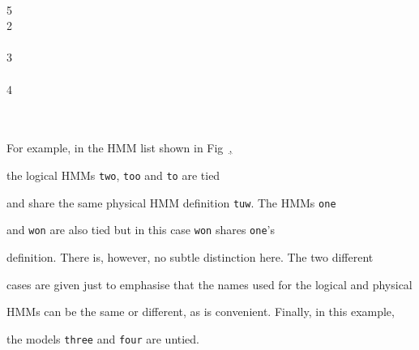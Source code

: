 { \\


\>  5  \\


\>  2 \\


\>\>    \\


\>  3 \\


\>\>    \\


\>  4 \\


\>\>    \\


\>   \\




}










For example, in the HMM list shown in Fig~\href{f:hlisteg},


the logical HMMs {\tt two}, {\tt too} and {\tt to} are tied


and share the same physical HMM definition {\tt tuw}.  The HMMs {\tt one}


and {\tt won} are also tied but in this case {\tt won} shares {\tt one}'s


definition.  There is, however, no subtle distinction here. The two different


cases are given just to emphasise that the names used for the logical and physical


HMMs can be the same or different, as is convenient.  Finally, in this example,


the models {\tt three} and {\tt four} are untied.










